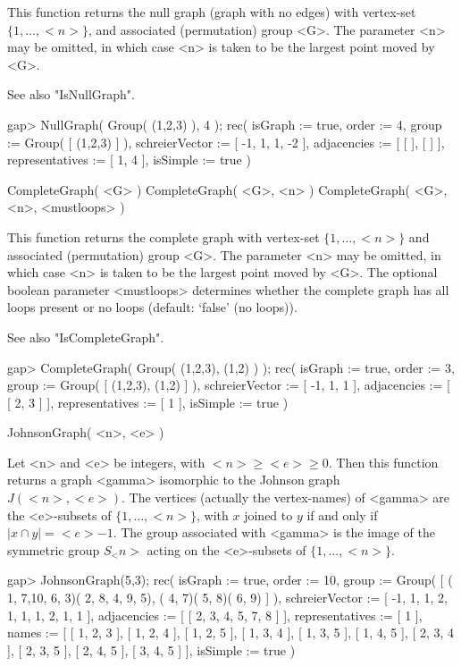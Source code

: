 This function returns the null graph (graph with no edges) with vertex-set
$\{1,\ldots,<n>\}$, and associated (permutation) group <G>. The parameter
<n> may be omitted, in which case <n> is taken to be the largest point
moved by <G>.

See also "IsNullGraph".

\beginexample
gap> NullGraph( Group( (1,2,3) ), 4 );
rec(
  isGraph := true,
  order := 4,
  group := Group( [ (1,2,3) ] ),
  schreierVector := [ -1, 1, 1, -2 ],
  adjacencies := [ [  ], [  ] ],
  representatives := [ 1, 4 ],
  isSimple := true )
\endexample


\>CompleteGraph( <G> )
\>CompleteGraph( <G>, <n> )
\>CompleteGraph( <G>, <n>, <mustloops> )

This function returns the complete graph with vertex-set
$\{1,\ldots,<n>\}$ and associated (permutation) group <G>. The parameter
<n> may be  omitted, in which case <n> is taken to be the largest point
moved by <G>.  The optional boolean parameter <mustloops> determines
whether the complete graph has all loops present or no loops (default:
`false' (no loops)).

See also "IsCompleteGraph".

\beginexample
gap> CompleteGraph( Group( (1,2,3), (1,2) ) );
rec(
  isGraph := true,
  order := 3,
  group := Group( [ (1,2,3), (1,2) ] ),
  schreierVector := [ -1, 1, 1 ],
  adjacencies := [ [ 2, 3 ] ],
  representatives := [ 1 ],
  isSimple := true )
\endexample


\>JohnsonGraph( <n>, <e> )

Let <n> and <e> be integers, with $<n>\ge <e>\ge 0$.  Then this function
returns a graph <gamma> isomorphic to the Johnson graph $J(<n>,<e>)$.
The vertices (actually the vertex-names) of <gamma> are the <e>-subsets
of $\{1,\ldots, <n>\}$, with $x$ joined to $y$ if and only if $|x \cap y|
= <e>-1$.  The group associated with <gamma> is the image of the symmetric
group $S_<n>$ acting on the <e>-subsets of $\{1,\ldots,<n>\}$.

\beginexample
gap> JohnsonGraph(5,3);
rec(
  isGraph := true,
  order := 10,
  group := Group( [ ( 1, 7,10, 6, 3)( 2, 8, 4, 9, 5), ( 4, 7)( 5, 8)( 6, 9)
     ] ),
  schreierVector := [ -1, 1, 1, 2, 1, 1, 1, 2, 1, 1 ],
  adjacencies := [ [ 2, 3, 4, 5, 7, 8 ] ],
  representatives := [ 1 ],
  names := [ [ 1, 2, 3 ], [ 1, 2, 4 ], [ 1, 2, 5 ], [ 1, 3, 4 ], [ 1, 3, 5 ],
      [ 1, 4, 5 ], [ 2, 3, 4 ], [ 2, 3, 5 ], [ 2, 4, 5 ], [ 3, 4, 5 ] ],
  isSimple := true )
\endexample


